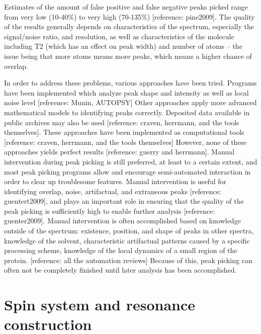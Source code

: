 Estimates of the amount of false positive and false negative peaks picked 
range from very low (10-40\%) to very high (70-135\%) [reference: pine2009].  
The quality of the results generally depends on characteristics of the 
spectrum, especially the signal/noise ratio, and resolution, as well as 
characteristics of the molecule including T2 (which has an effect on peak 
width) and number of atoms -- the issue being that more atoms means more 
peaks, which means a higher chance of overlap.

In order to address these problems, various approaches have been tried.  
Programs have been implemented which analyze peak shape and intensity as 
well as local noise level [reference: Munin, AUTOPSY]  Other approaches 
apply more advanced mathematical models to identifying peaks correctly.  
Deposited data available in public archives may also be used 
[reference: craven, herrmann, and the tools themselves].  These approaches 
have been implemented as computational tools [reference: craven, herrmann, 
and the tools themselves]  However, none of these approaches yields perfect 
results [reference: guerry and herrmann].  Manual intervention during peak picking 
is still preferred, at least to a certain extent, and most peak picking 
programs allow and encourage semi-automated interaction in order to clear 
up troublesome features.  Manual intervention is useful for identifying 
overlap, noise, artifactual, and extraneous peaks [reference: guentert2009], 
and plays an important role in ensuring that the quality of the peak picking 
is sufficiently high to enable further analysis [reference: guenter2009].  
Manual intervention is often accomplished based on knowledge outside of the 
spectrum: existence, position, and shape of peaks in other spectra, knowledge 
of the solvent, characteristic artifactual patterns caused by a specific 
processing scheme, knowledge of the local dynamics of a small region of the 
protein.  [reference: all the automation reviews]  Because of this, 
peak picking can often not be completely finished until later analysis has 
been accomplished.


\section{Spin system and resonance construction}

